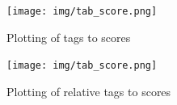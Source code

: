 \documentclass[figures_tabs.tex]{subfiles}
\begin{document}
\begin{figure}[H]
    \centering
    \texttt{[image: img/tab\_score.png]}
    \caption{Plotting of tags to scores}
    \label{fig:tag_score}
\end{figure}

\begin{figure}[H]
    \centering
    \texttt{[image: img/tab\_score.png]}
    \caption{Plotting of relative tags to scores}
    \label{fig:tag_score_rel}
\end{figure}
\end{document}
